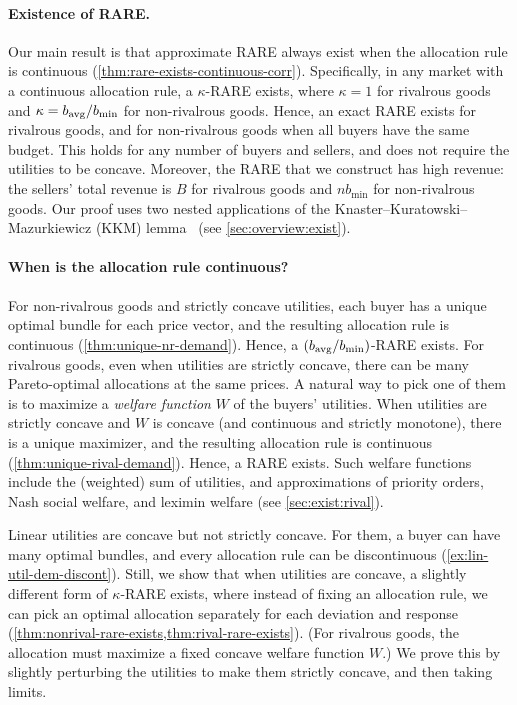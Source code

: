 \paragraph{Existence of RARE.}
Our main result is that approximate RARE always exist when the allocation rule is continuous
(\cref{thm:rare-exists-continuous-corr}).
Specifically, in any market with a continuous allocation rule, a $\kappa$-RARE exists,
where $\kappa = 1$ for rivalrous goods and $\kappa = b_{\operatorname{avg}}/b_{\min}$ for non-rivalrous goods.
Hence, an exact RARE exists for rivalrous goods,
and for non-rivalrous goods when all buyers have the same budget.
This holds for any number of buyers and sellers, and does not require the utilities to be concave.
Moreover, the RARE that we construct has high revenue:
the sellers' total revenue is $B$ for rivalrous goods and $nb_{\min}$ for non-rivalrous goods.
Our proof uses two nested applications of
the Knaster--Kuratowski--Mazurkiewicz (KKM) lemma~\cite{KKM1929} (see \cref{sec:overview:exist}).

\paragraph{When is the allocation rule continuous?}
For non-rivalrous goods and strictly concave utilities,
each buyer has a unique optimal bundle for each price vector,
and the resulting allocation rule is continuous (\cref{thm:unique-nr-demand}).
Hence, a $(b_{\operatorname{avg}}/b_{\min})$-RARE exists.
For rivalrous goods, even when utilities are strictly concave,
there can be many Pareto-optimal allocations at the same prices.
A natural way to pick one of them is to maximize a \emph{welfare function} $W$ of the buyers' utilities.
When utilities are strictly concave and $W$ is concave (and continuous and strictly monotone),
there is a unique maximizer, and the resulting allocation rule is continuous (\cref{thm:unique-rival-demand}).
Hence, a RARE exists.
Such welfare functions include the (weighted) sum of utilities,
and approximations of priority orders, Nash social welfare, and leximin welfare
(see \cref{sec:exist:rival}).

Linear utilities are concave but not strictly concave.
For them, a buyer can have many optimal bundles,
and every allocation rule can be discontinuous (\cref{ex:lin-util-dem-discont}).
Still, we show that when utilities are concave, a slightly different form of $\kappa$-RARE exists,
where instead of fixing an allocation rule,
we can pick an optimal allocation separately for each deviation and response
(\cref{thm:nonrival-rare-exists,thm:rival-rare-exists}).
(For rivalrous goods, the allocation must maximize a fixed concave welfare function $W$.)
We prove this by slightly perturbing the utilities to make them strictly concave,
and then taking limits.



